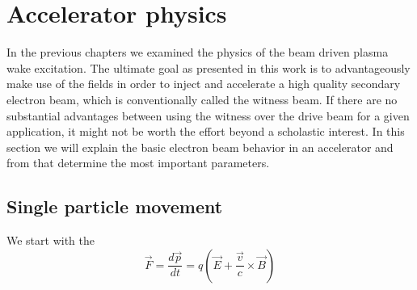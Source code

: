 \section{Accelerator physics}
In the previous chapters we examined the physics of the beam driven plasma wake excitation. 
The ultimate goal as presented in this work is to advantageously make use of the fields in order to inject and accelerate a high quality secondary electron beam, which is conventionally called the witness beam. If there are no substantial advantages between  using the witness over the drive beam for a given application, it might not be worth the effort beyond a scholastic interest.
In this section we will explain the basic electron beam behavior in an accelerator and from that determine the most important parameters. 
\subsection{Single particle movement}

We start with the 
\begin{equation}
\vec{F}=\frac{d\vec{p}}{dt}=q(\vec{E}+\frac{\vec{v}}{c}\times\vec{B})
\end{equation}

